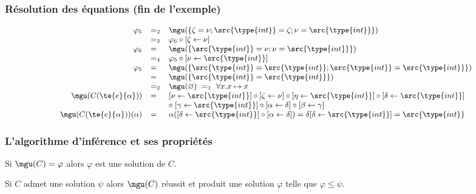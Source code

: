 %
\begin{frame}
\frametitle{Résolution des équations (fin de l'exemple)}

\[\small
\begin{array}{rll}
  \varphi_5 &=_2& \mgu(\{\zeta = \nu; \src{\type{int}} = \zeta; \nu =
  \src{\type{int}}\})\\
            &=_3& \varphi_6 \circ [\zeta \leftarrow \nu]\\
  \varphi_6 &=& \mgu(\{\src{\type{int}} = \nu; \nu =
  \src{\type{int}}\})\\
            &=_4& \varphi_5 \circ [\nu \leftarrow \src{\type{int}}]\\
  \varphi_5 &=& \mgu(\{\src{\type{int}} = \src{\type{int}};
  \src{\type{int}} = \src{\type{int}}\})\\
            &=& \mgu(\{\src{\type{int}} = \src{\type{int}}\})\\
            &=_2& \mgu(\varnothing) \ =_1 \ \forall x.x \mapsto x\\
\mgu(C(\te{e}{\alpha})) &=& [\nu \leftarrow \src{\type{int}}] \circ
[\zeta \leftarrow \nu] \circ [\eta \leftarrow \src{\type{int}}] \circ
[\delta \leftarrow \src{\type{int}}]\\
&& \circ \; [\gamma \leftarrow \src{\type{int}}] \circ [\alpha
  \leftarrow \delta] \circ [\beta \leftarrow \gamma]\\
\mgu(C(\te{e}{\alpha})) (\alpha) &=& \alpha ([\delta \leftarrow
  \src{\type{int}}] \circ [\alpha \leftarrow \delta]) = \delta [\delta
  \leftarrow \src{\type{int}}] = \src{\type{int}}
\end{array}
\]

\end{frame}


%
\begin{frame}
\frametitle{L'algorithme d'inférence et ses propriétés}

\begin{Prop}
Si $\mgu(C) = \varphi$ alors $\varphi$ est une solution de $C$.
\end{Prop}

\bigskip

\begin{Prop}
Si $C$ admet une solution $\psi$ alors $\mgu(C)$ réussit et produit
une solution $\varphi$ telle que $\varphi \leqslant \psi$.
\end{Prop}

\end{frame}
